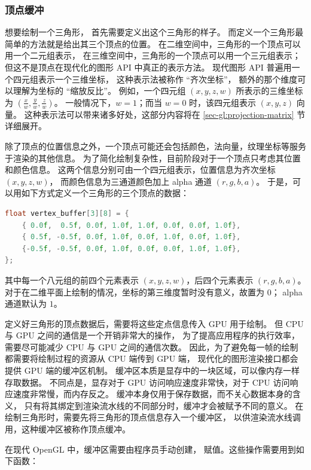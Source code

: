 \documentclass[fontset=windows]{ctexart}
\begin{document}
\subsubsection{顶点缓冲}

想要绘制一个三角形，
首先需要定义出这个三角形的样子。
而定义一个三角形最简单的方法就是给出其三个顶点的位置。
在二维空间中，三角形的一个顶点可以用一个二元组表示，
在三维空间中，三角形的一个顶点可以用一个三元组表示；
但这不是顶点在现代化的图形 API 中真正的表示方法。
现代图形 API 普遍用一个四元组表示一个三维坐标，
这种表示法被称作 “齐次坐标”，
额外的那个维度可以理解为坐标的 “缩放反比”。
例如，一个四元组 $(x,y,z,w)$ 所表示的三维坐标为
$(\frac{x}{w},\frac{y}{w},\frac{z}{w})$。
一般情况下，$w=1$；而当 $w=0$ 时，该四元组表示 $(x,y,z)$ 向量。
这种表示法可以带来诸多好处，这部分内容将在 \ref{sec-gl:projection-matrix} 节详细展开。

除了顶点的位置信息之外，一个顶点可能还会包括颜色，法向量，纹理坐标等服务于渲染的其他信息。
为了简化绘制复杂性，目前阶段对于一个顶点只考虑其位置和颜色信息。
这两个信息分别可由一个四元组表示，位置信息为齐次坐标 $(x,y,z,w)$，
而颜色信息为三通道颜色加上 alpha 通道 $(r,g,b,a)$。
于是，可以用如下方式定义一个三角形的三个顶点的数据：

\begin{lstlisting}[language=c++]
float vertex_buffer[3][8] = {
    { 0.0f,  0.5f, 0.0f, 1.0f, 1.0f, 0.0f, 0.0f, 1.0f},
    { 0.5f, -0.5f, 0.0f, 1.0f, 0.0f, 1.0f, 0.0f, 1.0f},
    {-0.5f, -0.5f, 0.0f, 1.0f, 0.0f, 0.0f, 1.0f, 1.0f},
};
\end{lstlisting}

其中每一个八元组的前四个元素表示 $(x,y,z,w)$，后四个元素表示 $(r,g,b,a)$。
对于在二维平面上绘制的情况，坐标的第三维度暂时没有意义，故置为 $0$；
alpha 通道默认为 $1$。

定义好三角形的顶点数据后，需要将这些定点信息传入 GPU 用于绘制。
但 CPU 与 GPU 之间的通信是一个开销非常大的操作，
为了提高应用程序的执行效率，
需要尽可能减少 CPU 与 GPU 之间的通信次数。
因此，为了避免每一帧的绘制都需要将绘制过程的资源从 CPU 端传到 GPU 端，
现代化的图形渲染接口都会提供 GPU 端的缓冲区机制。
缓冲区本质是显存中的一块区域，可以像内存一样存取数据。
不同点是，显存对于 GPU 访问响应速度非常快，对于 CPU 访问响应速度非常慢，而内存反之。
缓冲本身仅用于保存数据，而不关心数据本身的含义，
只有将其绑定到渲染流水线的不同部分时，缓冲才会被赋予不同的意义。
在绘制三角形时，需要先将三角形的顶点信息存入一个缓冲区，
以供渲染流水线调用，这种缓冲区被称作顶点缓冲。

在现代 OpenGL 中，缓冲区需要由程序员手动创建，
赋值。这些操作需要用到如下函数：
\end{document}
